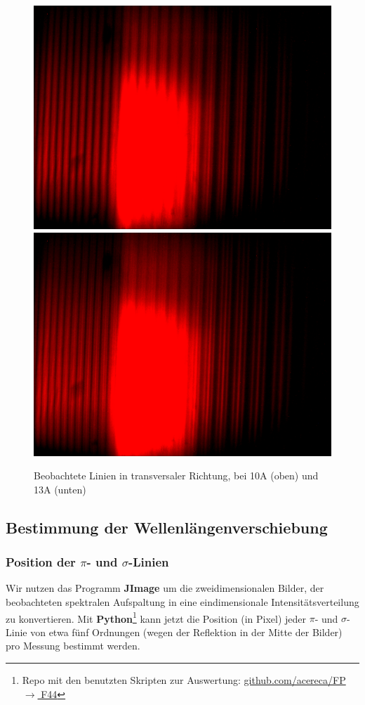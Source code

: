       \begin{figure}[H]
        \centering
        \includegraphics[width=.6\paperwidth,trim={0 600pt 0 500pt}, clip]{Auswertung/data/trans/10A/10A_l}
        \includegraphics[width=.6\paperwidth,trim={0 200pt 0 900pt}, clip]{Auswertung/data/trans/13A/13A_l}
        \caption{Beobachtete Linien in transversaler Richtung, bei 10A (oben) und 13A (unten)}
        \label{pic::4}
      \end{figure}

    \subsection{Bestimmung der Wellenlängenverschiebung}
      \subsubsection{Position der $\pi$- und $\sigma$-Linien}
        Wir nutzen das Programm \textbf{JImage} um die zweidimensionalen Bilder, der beobachteten spektralen Aufspaltung in eine eindimensionale Intensitätsverteilung zu konvertieren. Mit \textbf{Python}\footnote{Repo mit den benutzten Skripten zur Auswertung:  \href{github.com/acereca/FP/tree/master/F44 - Zeemanspektroskopie}{github.com/acereca/FP $\rightarrow$ F44}} kann jetzt die Position (in Pixel) jeder $\pi$- und $\sigma$-Linie von etwa fünf Ordnungen (wegen der Reflektion in der Mitte der Bilder) pro Messung bestimmt werden.

